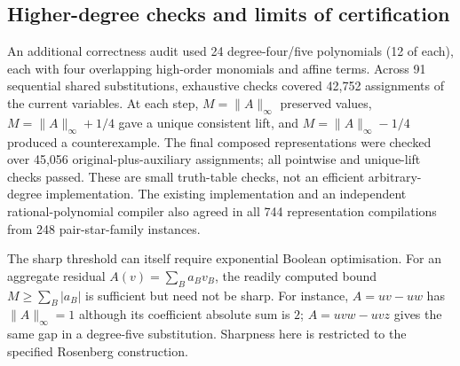 \subsection{Higher-degree checks and limits of certification}
\label{app:higher-degree-scaling-audit}
An additional correctness audit used 24 degree-four/five polynomials (12 of each),
each with four overlapping high-order monomials and affine terms.
Across 91 sequential shared substitutions, exhaustive checks covered
42,752 assignments of the current variables. At each step,
$M=\|A\|_\infty$ preserved values, $M=\|A\|_\infty+1/4$ gave a unique
consistent lift, and $M=\|A\|_\infty-1/4$ produced a counterexample.
The final composed representations were checked over 45,056
original-plus-auxiliary assignments; all pointwise and unique-lift checks passed.
These are small truth-table checks, not an efficient arbitrary-degree implementation.
The existing implementation and an independent rational-polynomial compiler also
agreed in all 744 representation compilations from 248 pair-star-family instances.

The sharp threshold can itself require exponential Boolean optimisation.
For an aggregate residual $A(v)=\sum_B a_Bv_B$, the readily computed bound
$M\geq\sum_B|a_B|$ is sufficient but need not be sharp. For instance,
$A=u v-u w$ has $\|A\|_\infty=1$ although its coefficient absolute sum is $2$;
$A=u v w-u v z$ gives the same gap in a degree-five substitution.
Sharpness here is restricted to the specified Rosenberg construction.


